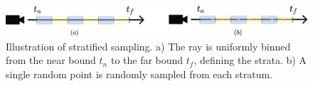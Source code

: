 \begin{figure}[h]
    \centering
    \includegraphics[width=1.0\textwidth]{figures/stratified-sampling.png}
    \caption[Stratified sampling]{Illustration of stratified sampling. a) The ray is uniformly binned from the near bound $t_n$ to the far bound $t_f$, defining the strata. b) A single random point is randomly sampled from each stratum.}
    \label{fig:stratified-sampling}
\end{figure}